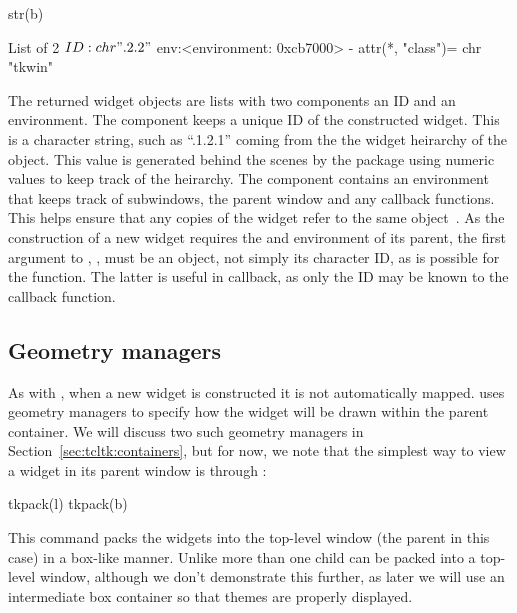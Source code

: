 \begin{Schunk}
\begin{Sinput}
 str(b)
\end{Sinput}
\begin{Soutput}
List of 2
 $ ID : chr ".2.2"
 $ env:<environment: 0xcb7000> 
 - attr(*, "class")= chr "tkwin"
\end{Soutput}
\end{Schunk}

The returned widget objects are lists with two components an ID and an
environment. The  component keeps a unique ID of the
constructed widget. This is a character string, such as ``.1.2.1''
coming from the the widget heirarchy of the object. This value is
generated behind the scenes by the  package using numeric
values to keep track of the heirarchy. The  component
contains an environment that keeps track of subwindows, the parent
window and any callback functions. This helps ensure that any copies
of the widget refer to the same object~\citep{Dalgaard-DSC}. As the
construction of a new widget requires the  and environment of
its parent, the first argument to , ,
must be an \R\/ \TK\/ object, not simply its character ID, as is
possible for the  function. The latter is useful in
callback, as only the ID may be known to the callback function.


\subsection{Geometry managers}
\label{sec:tcltk:overview:geometry-managers}

As with \GTK, when a new widget is constructed it is not automatically mapped. \TK\/ uses geometry managers to specify how the widget will be drawn within the parent container. We will discuss two such geometry managers in Section~\ref{sec:tcltk:containers}, but for now, we note that the simplest way to view a widget in its parent window is through :
\begin{Schunk}
\begin{Sinput}
 tkpack(l)
 tkpack(b)
\end{Sinput}
\end{Schunk}

This command packs the widgets into the top-level window (the parent
in this case) in a box-like manner. Unlike \GTK\/ more than one child
can be packed into a top-level window, although we don't demonstrate
this further, as later we will use an intermediate 
box container so that themes are properly displayed.

